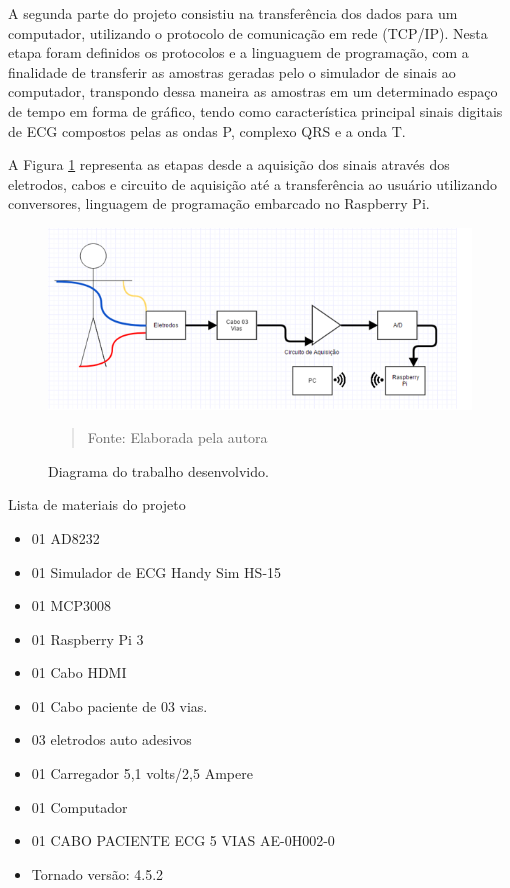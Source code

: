 \documentclass[12pt, a4paper]{article}
\begin{document}
A segunda parte do projeto consistiu na transferência dos dados para um computador, utilizando o protocolo de comunicação em rede (TCP/IP). Nesta etapa foram definidos os protocolos e a linguaguem de programação, com a finalidade de transferir  as amostras geradas pelo o simulador de sinais ao computador, transpondo dessa maneira as amostras em um determinado espaço de tempo em forma de gráfico, tendo como característica principal sinais digitais de ECG compostos pelas as ondas P, complexo QRS e a onda T. 

A Figura \ref{fig:pap} representa as etapas desde a aquisição dos sinais através dos eletrodos, cabos e circuito de aquisição até a transferência ao usuário utilizando conversores, linguagem de programação embarcado no Raspberry Pi. 
    
\begin{figure}[H]
\begin{center}
			\caption{Diagrama do trabalho  desenvolvido.}
			\includegraphics[width=.9\textwidth]{Figuras/pac.PNG}
            \vspace*{\fill} 
            \begin{quote} 
            \centering 
            Fonte: Elaborada pela autora
            \end{quote}
            \vspace*{\fill}
			\label{fig:pap}
\end{center}
\end{figure}

Lista de materiais do projeto


\begin{itemize}
\item 01 AD8232
\item 01 Simulador de ECG Handy Sim HS-15
\item 01 MCP3008
\item 01 Raspberry Pi 3
\item 01 Cabo HDMI
\item 01 Cabo paciente de 03 vias.
\item 03 eletrodos auto adesivos
\item 01 Carregador 5,1 volts/2,5 Ampere
\item 01 Computador
\item 01 CABO PACIENTE ECG 5 VIAS AE-0H002-0
\item Tornado versão: 4.5.2
\end{itemize}
\end{document}
